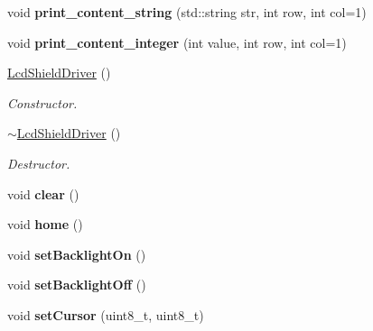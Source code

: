 \begin{DoxyCompactItemize}
\mbox{\label{classLcdShieldDriver_a893f217db662b34726d0684bb014f7d4}} 
void {\bfseries print\+\_\+content\+\_\+string} (std\+::string str, int row, int col=1)
\item 
\mbox{\label{classLcdShieldDriver_ae1a249341c06d6992767e8176ef96056}} 
void {\bfseries print\+\_\+content\+\_\+integer} (int value, int row, int col=1)
\item 
\mbox{\label{classLcdShieldDriver_a14d2027ac041be273d6b894a6d66bb1f}} 
\hyperlink{classLcdShieldDriver_a14d2027ac041be273d6b894a6d66bb1f}{Lcd\+Shield\+Driver} ()
\begin{DoxyCompactList}\small\item\em Constructor. \end{DoxyCompactList}\item 
\mbox{\label{classLcdShieldDriver_aaec080d1c36326c1e58642a7e28d85b1}} 
\hyperlink{classLcdShieldDriver_aaec080d1c36326c1e58642a7e28d85b1}{$\sim$\+Lcd\+Shield\+Driver} ()
\begin{DoxyCompactList}\small\item\em Destructor. \end{DoxyCompactList}\item 
\mbox{\label{classLcdShieldDriver_a43e151fc827a4d8d982bc2857b78262e}} 
void {\bfseries clear} ()
\item 
\mbox{\label{classLcdShieldDriver_a7bccc296eef476eb49984bdf8fdebb14}} 
void {\bfseries home} ()
\item 
\mbox{\label{classLcdShieldDriver_a68a86a7407fd3df5714f3351d657e499}} 
void {\bfseries set\+Backlight\+On} ()
\item 
\mbox{\label{classLcdShieldDriver_a81639e7553501343137be8984d7ea7d9}} 
void {\bfseries set\+Backlight\+Off} ()
\item 
\mbox{\label{classLcdShieldDriver_a6733a16dc0e1d58cfdfb4019ea2e6582}} 
void {\bfseries set\+Cursor} (uint8\+\_\+t, uint8\+\_\+t)
\item 

\end{DoxyCompactItemize}
